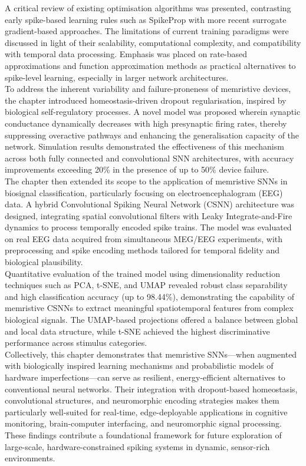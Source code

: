 \noindent A critical review of existing optimisation algorithms was presented, contrasting early spike-based learning rules such as SpikeProp with more recent surrogate gradient-based approaches. The limitations of current training paradigms were discussed in light of their scalability, computational complexity, and compatibility with temporal data processing. Emphasis was placed on rate-based approximations and function approximation methods as practical alternatives to spike-level learning, especially in larger network architectures. \\

\noindent To address the inherent variability and failure-proneness of memristive devices, the chapter introduced homeostasis-driven dropout regularisation, inspired by biological self-regulatory processes. A novel model was proposed wherein synaptic conductance dynamically decreases with high presynaptic firing rates, thereby suppressing overactive pathways and enhancing the generalisation capacity of the network. Simulation results demonstrated the effectiveness of this mechanism across both fully connected and convolutional SNN architectures, with accuracy improvements exceeding 20\% in the presence of up to 50\% device failure.\\

\noindent The chapter then extended its scope to the application of memristive SNNs in biosignal classification, particularly focusing on electroencephalogram (EEG) data. A hybrid Convolutional Spiking Neural Network (CSNN) architecture was designed, integrating spatial convolutional filters with Leaky Integrate-and-Fire dynamics to process temporally encoded spike trains. The model was evaluated on real EEG data acquired from simultaneous MEG/EEG experiments, with preprocessing and spike encoding methods tailored for temporal fidelity and biological plausibility.\\

\noindent Quantitative evaluation of the trained model using dimensionality reduction techniques such as PCA, t-SNE, and UMAP revealed robust class separability and high classification accuracy (up to 98.44\%), demonstrating the capability of memristive CSNNs to extract meaningful spatiotemporal features from complex biological signals. The UMAP-based projections offered a balance between global and local data structure, while t-SNE achieved the highest discriminative performance across stimulus categories. \\

\noindent Collectively, this chapter demonstrates that memristive SNNs—when augmented with biologically inspired learning mechanisms and probabilistic models of hardware imperfections—can serve as resilient, energy-efficient alternatives to conventional neural networks. Their integration with dropout-based homeostasis, convolutional structures, and neuromorphic encoding strategies makes them particularly well-suited for real-time, edge-deployable applications in cognitive monitoring, brain-computer interfacing, and neuromorphic signal processing. These findings contribute a foundational framework for future exploration of large-scale, hardware-constrained spiking systems in dynamic, sensor-rich environments.\\
